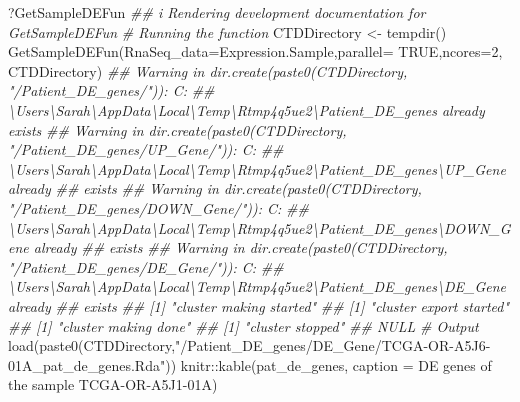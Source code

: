 \documentclass[]{article}
\newcommand{\hlnum}[1]{\textcolor[rgb]{0.816,0.125,0.439}{#1}}%
\newcommand{\hlstr}[1]{\textcolor[rgb]{0.251,0.627,0.251}{#1}}%
\newcommand{\hlcom}[1]{\textcolor[rgb]{0.502,0.502,0.502}{\textit{#1}}}%
\newcommand{\hlstd}[1]{\textcolor[rgb]{0.251,0.251,0.251}{#1}}%
\newenvironment{Shaded}{\begin{myshaded}}{\end{myshaded}}
\newcommand{\DecValTok}[1]{\hlnum{#1}}
\newcommand{\ConstantTok}[1]{\hlnum{#1}}
\newcommand{\SpecialCharTok}[1]{\hlstr{#1}}
\newcommand{\StringTok}[1]{\hlstr{#1}}
\newcommand{\CommentTok}[1]{\hlcom{#1}}
\newcommand{\DocumentationTok}[1]{\hlcom{#1}}
\newcommand{\OtherTok}[1]{{#1}}
\newcommand{\FunctionTok}[1]{\hlstd{#1}}
\newcommand{\AttributeTok}[1]{{#1}}
\newcommand{\NormalTok}[1]{\hlstd{#1}}
\begin{document}
\begin{Shaded}
\begin{Highlighting}[]
\NormalTok{?GetSampleDEFun}
\DocumentationTok{\#\# i Rendering development documentation for \textquotesingle{}GetSampleDEFun\textquotesingle{}}
\CommentTok{\# Running the function}
\NormalTok{CTDDirectory }\OtherTok{\textless{}{-}} \FunctionTok{tempdir}\NormalTok{()}
\FunctionTok{GetSampleDEFun}\NormalTok{(}\AttributeTok{RnaSeq\_data=}\NormalTok{Expression.Sample,}\AttributeTok{parallel=} \ConstantTok{TRUE}\NormalTok{,}\AttributeTok{ncores=}\DecValTok{2}\NormalTok{, CTDDirectory)}
\DocumentationTok{\#\# Warning in dir.create(paste0(CTDDirectory, "/Patient\_DE\_genes/")): \textquotesingle{}C:}
\DocumentationTok{\#\# \textbackslash{}Users\textbackslash{}Sarah\textbackslash{}AppData\textbackslash{}Local\textbackslash{}Temp\textbackslash{}Rtmp4q5ue2\textbackslash{}Patient\_DE\_genes\textquotesingle{} already exists}
\DocumentationTok{\#\# Warning in dir.create(paste0(CTDDirectory, "/Patient\_DE\_genes/UP\_Gene/")): \textquotesingle{}C:}
\DocumentationTok{\#\# \textbackslash{}Users\textbackslash{}Sarah\textbackslash{}AppData\textbackslash{}Local\textbackslash{}Temp\textbackslash{}Rtmp4q5ue2\textbackslash{}Patient\_DE\_genes\textbackslash{}UP\_Gene\textquotesingle{} already}
\DocumentationTok{\#\# exists}
\DocumentationTok{\#\# Warning in dir.create(paste0(CTDDirectory, "/Patient\_DE\_genes/DOWN\_Gene/")): \textquotesingle{}C:}
\DocumentationTok{\#\# \textbackslash{}Users\textbackslash{}Sarah\textbackslash{}AppData\textbackslash{}Local\textbackslash{}Temp\textbackslash{}Rtmp4q5ue2\textbackslash{}Patient\_DE\_genes\textbackslash{}DOWN\_Gene\textquotesingle{} already}
\DocumentationTok{\#\# exists}
\DocumentationTok{\#\# Warning in dir.create(paste0(CTDDirectory, "/Patient\_DE\_genes/DE\_Gene/")): \textquotesingle{}C:}
\DocumentationTok{\#\# \textbackslash{}Users\textbackslash{}Sarah\textbackslash{}AppData\textbackslash{}Local\textbackslash{}Temp\textbackslash{}Rtmp4q5ue2\textbackslash{}Patient\_DE\_genes\textbackslash{}DE\_Gene\textquotesingle{} already}
\DocumentationTok{\#\# exists}
\DocumentationTok{\#\# [1] "cluster making started"}
\DocumentationTok{\#\# [1] "cluster export started"}
\DocumentationTok{\#\# [1] "cluster making done"}
\DocumentationTok{\#\# [1] "cluster stopped"}
\DocumentationTok{\#\# NULL}
\CommentTok{\# Output}
\FunctionTok{load}\NormalTok{(}\FunctionTok{paste0}\NormalTok{(CTDDirectory,}\StringTok{"/Patient\_DE\_genes/DE\_Gene/TCGA{-}OR{-}A5J6{-}01A\_pat\_de\_genes.Rda"}\NormalTok{))}
\NormalTok{knitr}\SpecialCharTok{::}\FunctionTok{kable}\NormalTok{(pat\_de\_genes, }\AttributeTok{caption =} \StringTok{\textquotesingle{}DE genes of the sample TCGA{-}OR{-}A5J1{-}01A\textquotesingle{}}\NormalTok{)}
\end{Highlighting}
\end{Shaded}
\end{document}
